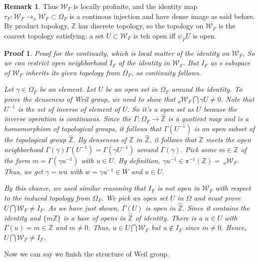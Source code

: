 \documentclass[12pt,a4paper,english]{article}
\theoremstyle{definition}
\newtheorem*{rem}{Remark}
\theoremstyle{plain}
\newtheorem{pf}{Proof}
\begin{document}
\begin{rem}
Thus $\mathcal{W}_{F}$ is locally profinite, and the identity map $\tau_{F}:\mathcal{W}_{F}\rightarrow _{a}\mathcal{W}_{F}\subset\Omega_{F}$ is a continous injection and have dense image as said before. By product topology, $\mathbb{Z}$ has discrete topology, so the topology on $\mathcal{W}_{F}$ is the coarest topology satisfying: a set $U\subset \mathcal{W}_{F}$ is teh open iff $\psi_{F}U$ is open.
\end{rem}
\begin{pf}
Proof for the continuity, which is local matter of the identity on $\mathcal{W}_{F}$, So we can restrict open neighborhood $I_{F}$ of the identity in $\mathcal{W}_{F}$. But $I_{F}$ as s subspace of $\mathcal{W}_{F}$ inherits its given topology from $\Omega_{F}$, so continuity follows.


Let $\gamma\in\Omega_{F}$ be an element. Let $U$ be an open set in $\Omega_{F}$ around the identity. To prove the denseness of Weil group, we need to show that $_{a}\mathcal{W}_{F}\bigcap\gamma U\not=0$. Note that $U^{-1}$ is the set of inverse of element of $U$. So it's a open set as $U$ because the inverse operation is continuous. Since the $\Gamma:\Omega_{F}\rightarrow\hat{\mathbb{Z}}$ is a quotient map and is a homomorphism of topological groups, it follows that $\Gamma(U^{-1})$ is an open subset of the topological group $\hat{\mathbb{Z}}$. By denseness of $\mathbb{Z}$ in $\hat{\mathbb{Z}}$, it follows that $\mathbb{Z}$ meets the open neighborhood $\Gamma(\gamma)\Gamma(U^{-1})=\Gamma(\gamma U^{-1})$ around $\Gamma(\gamma)$. Pick some $m\in\mathbb{Z}$ of the form $m=\Gamma(\gamma u^{-1})$ with $u\in U$. By definition, $\gamma u^{-1}\in \mathbb{\pi}^{-1}(\mathbb{Z})=\ _{a}\mathcal{W}_{F}$. Thus, we get $\gamma=wu$ with $w=\gamma u^{-1}\in W$ and $u\in U$.

By this chance, we used similar reasoning that $I_{F}$ is not open in $\mathcal{W}_{F}$ with respect to the induced topology from $\Omega_{F}$. We pick an open set $U$ in $\Omega$ and must prove $U\bigcap \mathcal{W}_{F}\not= I_{F}$. As we have just shown, $\Gamma(U)$ is open in $\hat{\mathbb{Z}}$. Since it contains the identity and $\{m\mathbb{Z}\}$ is a base of opens in $\hat{\mathbb{Z}}$ of identity. There is a $u\in U$ with $\Gamma(u)=m\in \mathbb{Z}
$ and $m\not=0$. Thus, $u\in U\bigcap \mathcal{W}_{F}$ but $u\not\in I_{F}$ since $m\not=0$. Hence, $U\bigcap\mathcal{W}_{F}\not=I_{F}$.
\end{pf}

Now we can say we finish the structure of Weil group.
\end{document}
